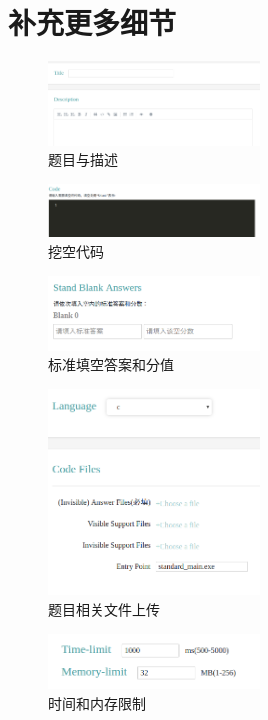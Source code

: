 \chapter{补充更多细节}
  \begin{figure}[h]
		\centering
  	\includegraphics[width=0.5\textwidth]{image/appendix/1}
  	\caption{题目与描述}
  \end{figure}
	\begin{figure}[h]
		\centering
		\includegraphics[width=0.5\textwidth]{image/appendix/2}
		\caption{挖空代码}
	\end{figure}
	\begin{figure}[h]
		\centering
		\includegraphics[width=0.5\textwidth]{image/appendix/3}
		\caption{标准填空答案和分值}
	\end{figure}
	\begin{figure}[h]
		\centering
		\includegraphics[width=0.5\textwidth]{image/appendix/4}
		\caption{题目相关文件上传}
	\end{figure}
	\begin{figure}[h]
		\centering
		\includegraphics[width=0.5\textwidth]{image/appendix/5}
		\caption{时间和内存限制}
	\end{figure}
